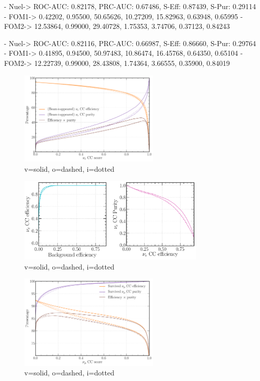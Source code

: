 - Nuel-> ROC-AUC: 0.82178, PRC-AUC: 0.67486, S-Eff: 0.87439, S-Pur: 0.29114
- FOM1-> 0.42202, 0.95500, 50.65626, 10.27209, 15.82963, 0.63948, 0.65995
- FOM2-> 12.53864, 0.99000, 29.40728, 1.75353, 3.74706, 0.37123, 0.84243

- Nuel-> ROC-AUC: 0.82116, PRC-AUC: 0.66987, S-Eff: 0.86660, S-Pur: 0.29764
- FOM1-> 0.41895, 0.94500, 50.97483, 10.86474, 16.45768, 0.64350, 0.65104
- FOM2-> 12.22739, 0.99000, 28.43808, 1.74364, 3.66555, 0.35900, 0.84019

\begin{figure} %
    \includegraphics[width=0.6\textwidth]{diagrams/7-cvn/chipsnet/repr_nuel_eff_curves.pdf}
    \caption[repr nuel eff curves short]
    {v=solid, o=dashed, i=dotted}
    \label{fig:repr_nuel_eff_curves}
\end{figure}

\begin{figure} %
    \includegraphics[width=0.8\textwidth]{diagrams/7-cvn/chipsnet/repr_nuel_comp_curves.pdf}
    \caption[repr nuel comp curves short]
    {v=solid, o=dashed, i=dotted}
    \label{fig:repr_nuel_comp_curves}
\end{figure}

\begin{figure} %
    \includegraphics[width=0.6\textwidth]{diagrams/7-cvn/chipsnet/repr_numu_eff_curves.pdf}
    \caption[repr numu eff curves short]
    {v=solid, o=dashed, i=dotted}
    \label{fig:repr_numu_eff_curves}
\end{figure}

